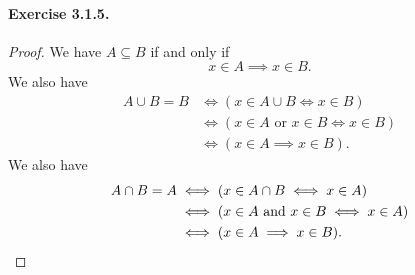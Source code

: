 \paragraph{Exercise 3.1.5.}
\begin{proof}
    We have $A\subseteq B$ if and only if \[x\in A \implies x\in B.\] We also have 
    \begin{align*}
        A \cup B = B &\iff (x\in A \cup B \iff x \in B) \\
        &\iff (x\in A \text{ or }x\in B \iff x \in B) \\
        &\iff (x\in A \implies x\in B).
    \end{align*}
    We also have 
    \begin{align*}
        A \cap B = A &\iff (x\in A \cap B \iff x \in A) \\
        &\iff (x\in A \text{ and }x\in B \iff x \in A) \\
        &\iff (x\in A \implies x\in B).\qedhere
    \end{align*}
\end{proof}

